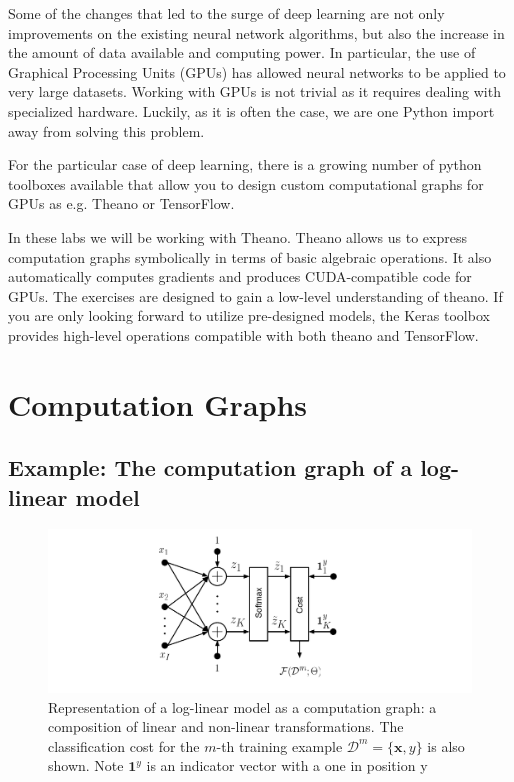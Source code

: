 Some of the changes that led to the surge of deep learning are not only
improvements on the existing neural network algorithms, but also
the increase in the amount of data available and computing power. In
particular, the use of Graphical Processing Units (GPUs) has allowed neural
networks to be applied to very large datasets. Working with GPUs is not trivial
as it requires dealing with specialized hardware. Luckily, as it is often the
case, we are one Python import away from solving this problem. 

For the particular case of deep learning, there is a growing number of python
toolboxes available that allow you to design custom computational graphs for
GPUs as e.g.
Theano\footnotemark{} or TensorFlow\footnotemark{}.

In these labs we will be working with Theano. Theano allows us to express
computation graphs symbolically in terms of basic algebraic operations. It also
automatically computes gradients and produces CUDA-compatible code for GPUs. The
exercises are designed to gain a low-level understanding of theano. If you are
only looking forward to utilize pre-designed models, the Keras
toolbox\footnotemark{} provides high-level
operations compatible with both theano and TensorFlow. 

\section{Computation Graphs} 

\subsection{Example: The computation graph of a log-linear model}

\begin{figure}[!h]
\centering
\includegraphics[scale=0.6]{figs/deep_learning/LogLin.pdf}
\caption{Representation of a log-linear model as a computation graph: a
composition of linear and non-linear transformations. The classification cost
for the $m$-th training example $\mathcal{D}^m=\{\mathbf{x}, y\}$ is also
shown. Note $\mathbf{1}^y$ is an indicator vector with a one in position y} 
\label{fig:LogLinear}
\end{figure}


